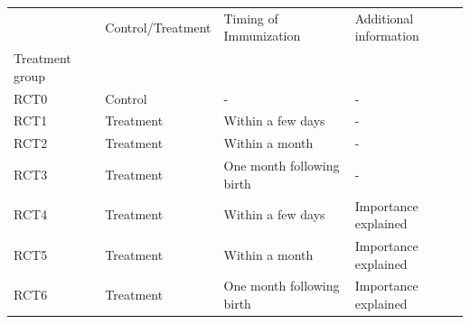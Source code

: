 \begin{tabular}{llll}
\toprule
 & Control/Treatment & Timing of Immunization & Additional information \\
Treatment group &  &  &  \\
\midrule
RCT0 & Control & - & - \\
RCT1 & Treatment & Within a few days & - \\
RCT2 & Treatment & Within a month & - \\
RCT3 & Treatment & One month following birth & - \\
RCT4 & Treatment & Within a few days & Importance explained \\
RCT5 & Treatment & Within a month & Importance explained \\
RCT6 & Treatment & One month following birth & Importance explained \\
\bottomrule
\end{tabular}
